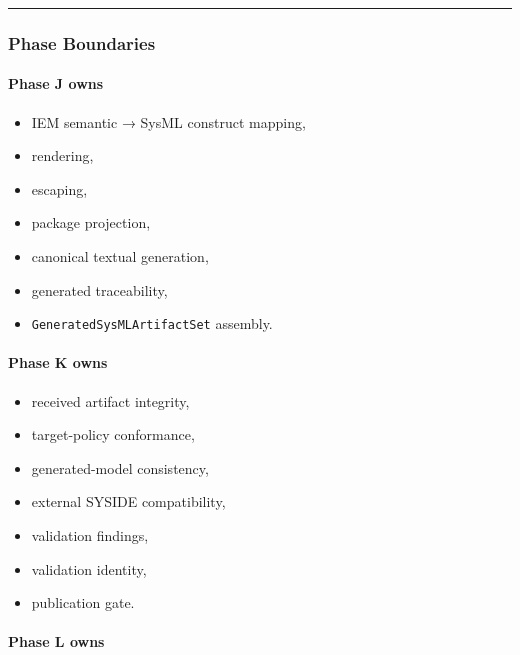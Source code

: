 \begin{center}\rule{0.5\linewidth}{0.5pt}\end{center}

\hypertarget{phase-boundaries-1}{%
\subsubsection{Phase Boundaries}\label{phase-boundaries-1}}

\hypertarget{phase-j-owns}{%
\paragraph{Phase J owns}\label{phase-j-owns}}

\begin{itemize}
\tightlist
\item
  IEM semantic → SysML construct mapping,
\item
  rendering,
\item
  escaping,
\item
  package projection,
\item
  canonical textual generation,
\item
  generated traceability,
\item
  \texttt{GeneratedSysMLArtifactSet} assembly.
\end{itemize}

\hypertarget{phase-k-owns}{%
\paragraph{Phase K owns}\label{phase-k-owns}}

\begin{itemize}
\tightlist
\item
  received artifact integrity,
\item
  target-policy conformance,
\item
  generated-model consistency,
\item
  external SYSIDE compatibility,
\item
  validation findings,
\item
  validation identity,
\item
  publication gate.
\end{itemize}

\hypertarget{phase-l-owns}{%
\paragraph{Phase L owns}\label{phase-l-owns}}

